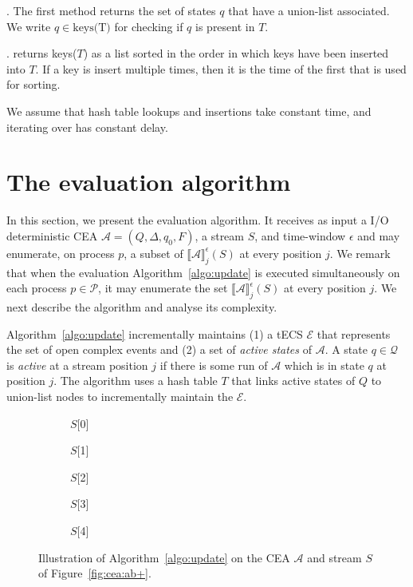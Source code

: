 . The first method returns the set of states $q$ that have a union-list associated. We write $q \in \text{keys(T)}$ for checking if $q$ is present in $T$.

. returns keys($T$) as a list sorted in the order in which keys have been inserted into $T$. If a key is insert multiple times, then it is the time of the first that is used for sorting.

We assume that hash table lookups and insertions take constant time, and iterating over has constant delay.

\section{The evaluation algorithm}\label{sec:evaluation}

In this section, we present the evaluation algorithm. It receives as input a I/O deterministic CEA ${\mathcal{A} = (Q, \Delta, q_{0}, F)}$, a stream $S$, and time-window $\epsilon$ and may enumerate, on process $p$, a subset of ${\llbracket \mathcal{A} \rrbracket}^{\epsilon}_{j}(S)$ at every position $j$. We remark that when the evaluation Algorithm~\ref{algo:update} is executed simultaneously on each process $p \in \mathcal{P}$, it may enumerate the set ${\llbracket \mathcal{A} \rrbracket}^{\epsilon}_{j}(S)$ at every position $j$. We next describe the algorithm and analyse its complexity.

Algorithm~\ref{algo:update} incrementally maintains (1) a tECS $\mathcal{E}$ that represents the set of open complex events and (2) a set of \emph{active states} of $\mathcal{A}$. A state $q \in \mathcal{Q}$ is \emph{active} at a stream position $j$ if there is some run of $\mathcal{A}$ which is in state $q$ at position $j$. The algorithm uses a hash table $T$ that links active states of $Q$ to union-list nodes to incrementally maintain the $\mathcal{E}$.

\begin{figure}[H]
  \centering
  \begin{subfigure}[b]{0.1\linewidth}
    \caption*{$S[$0$]$}
  \end{subfigure}
  \begin{subfigure}[b]{0.1\linewidth}
    \caption*{$S[$1$]$}
  \end{subfigure}
  \begin{subfigure}[b]{0.24\linewidth}
    \caption*{$S[$2$]$}
  \end{subfigure}
  \begin{subfigure}[b]{0.24\linewidth}
    \caption*{$S[$3$]$}
  \end{subfigure}
  \begin{subfigure}[b]{0.28\linewidth}
    \caption*{$S[$4$]$}
  \end{subfigure}
  \caption{Illustration of Algorithm~\ref{algo:update} on the CEA $\mathcal{A}$ and stream $S$ of Figure~\ref{fig:cea:ab+}.}
  \label{fig:tecs:update}
\end{figure}

